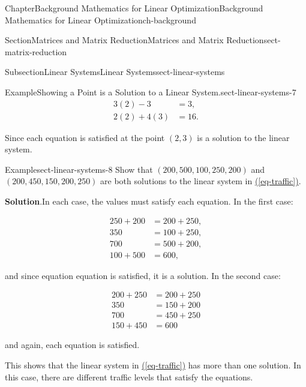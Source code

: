 \documentclass[oneside,10pt,]{book}
\newcommand{\blocktitlefont}{\relax}
\newcommand{\xreffont}{\relax}
\numberwithin{equation}{section}
\newcommand{\amp}{&}
\begin{document}
\begin{chapterptx}{Chapter}{Background Mathematics for Linear Optimization}{}{Background Mathematics for Linear Optimization}{}{}{ch-background}
\begin{sectionptx}{Section}{Matrices and Matrix Reduction}{}{Matrices and Matrix Reduction}{}{}{sect-matrix-reduction}
\begin{subsectionptx}{Subsection}{Linear Systems}{}{Linear Systems}{}{}{sect-linear-systems}
\begin{example}{Example}{Showing a Point is a Solution to a Linear System.}{sect-linear-systems-7}
%
\begin{align*}
3(2) - 3 \amp = 3, \\
2(2) + 4(3) \amp = 16.
\end{align*}
%
\par
Since each equation is satisfied at the point \((2,3)\) is a solution to the linear system.%
\end{example}
\begin{example}{Example}{}{sect-linear-systems-8}%
Show that \((200,500, 100, 250, 200)\) and \((200, 450, 150, 200, 250)\) are both solutions to the linear system in \hyperref[eq-traffic]{({\xreffont\ref{eq-traffic}})}.%
\par\smallskip%
\noindent\textbf{\blocktitlefont Solution}.\hypertarget{sect-linear-systems-8-2}{}\quad{}In each case, the values must satisfy each equation. In the first case:%
\par
%
\begin{equation*}
\begin{aligned} 250 + 200 \amp = 200 + 250, \\ 350 \amp = 100 + 250, \\ 700 \amp = 500 + 200, \\ 100 + 500 \amp = 600, \end{aligned}
\end{equation*}
%
\par
and since equation equation is satisfied, it is a solution. In the second case:%
\par
%
\begin{equation*}
\begin{aligned} 200 + 250 \amp = 200 + 250 \\ 350 \amp = 150 + 200 \\ 700 \amp = 450 + 250 \\ 150 + 450 \amp = 600 \end{aligned}
\end{equation*}
%
\par
and again, each equation is satisfied.%
\par
This shows that the linear system in \hyperref[eq-traffic]{({\xreffont\ref{eq-traffic}})} has more than one solution. In this case, there are different traffic levels that satisfy the equations.%
\end{example}
\end{subsectionptx}
%
%
\typeout{************************************************}
\typeout{************************************************}
%

\end{sectionptx}
\end{chapterptx}
\end{document}
